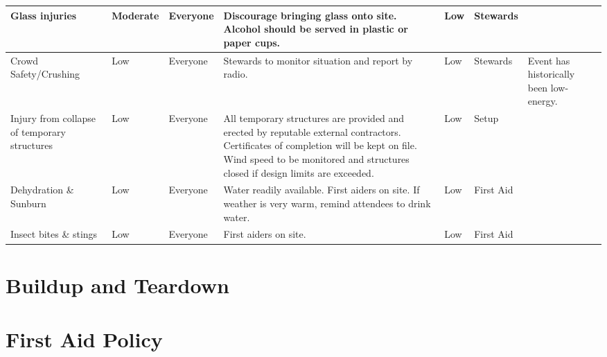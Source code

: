 \begin{landscape}
\begin{tabular}{| p{3cm} | l | p{1.5cm} | p{9cm} | p{1.5cm} | p{2cm} | p{6cm} |}
Glass injuries & Moderate & Everyone &
Discourage bringing glass onto site. Alcohol should be served in plastic or paper cups. &
Low & Stewards & \\ \hline

Crowd Safety/Crushing & Low & Everyone &
Stewards to monitor situation and report by radio. &
Low & Stewards & Event has historically been low-energy. \\ \hline

Injury from collapse of temporary structures & Low & Everyone &
All temporary structures are provided and erected by reputable external contractors.
Certificates of completion will be kept on file.
Wind speed to be monitored and structures closed if design limits are exceeded. &
Low & Setup & \\ \hline

Dehydration \& Sunburn & Low & Everyone &
Water readily available. First aiders on site. If weather is very warm, remind attendees to drink water.
& Low & First Aid & \\ \hline

Insect bites \& stings & Low & Everyone &
First aiders on site. & Low & First Aid & \\ \hline

\end{tabular}
\newpage
\thispagestyle{empty}
\section{Buildup and Teardown}


\end{landscape}
\restoregeometry

\appendix

\section{First Aid Policy}
\label{first-aid-policy}

\newpage

